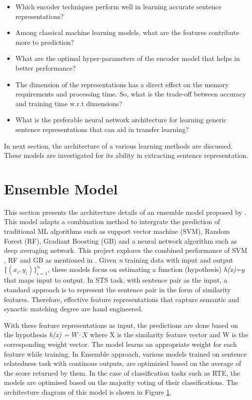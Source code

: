 \documentclass[12pt]{report} %
\begin{document}
\begin{itemize}
	\item Which encoder techniques perform well in learning accurate sentence representations?
	\item Among classical machine learning models, what are the features contribute more to prediction?
	\item What are the optimal hyper-parameters of the encoder model that helps in better performance?
	\item The dimension of the representations has a direct effect on the memory requirements and processing time. So, what is the trade-off between accuracy and training time w.r.t dimensions?
	\item What is the preferable neural network architecture for learning generic sentence representations that can aid in transfer learning?
\end{itemize}


In next section, the architecture of a various learning methods are discussed. These models are investigated for its ability in extracting sentence representation. 

\section{Ensemble Model}
\label{ensemble}

	This section presents the architecture details of an ensemble model proposed by \cite{tian2017ecnu}. This model adapts a combination method to intergrate the prediction of traditional ML algorithms such as support vector machine (SVM), Random Forest (RF), Gradiant Boosting (GB) and a neural network algorithm such as deep averaging network. This project explores the combined performance of SVM , RF and GB as mentioned in \cite{tian2017ecnu}. Given \textit{n} training data with input and output $ \{(x_i,y_i)\}^{n}_{i=1} $, these models focus on estimating a function (hypothesis) \textit{h(x)=y} that maps input to output. In STS task, with sentence pair as the input, a standard approach is to represent the sentence pair in the form of similarity features. Therefore,  effective feature representations that capture semantic and synactic matching degree are hand engineered. 
	
	With these feature representations as input, the predictions are done based on the hypothesis \textit{h(x) = $W \cdot X$} where X is the similarity feature vector and W is the corresponding weight vector.  The model learns an appropriate weight for each feature while training. In Ensemble approach, various models trained on sentence relatedness task with continous outputs, are optimizied based on the average of the score returned by them. In the case of classification tasks such as RTE, the models are optimised based on the majority voting of their classifications. The architecture diagram of this model is shown in Figure \ref{ensemble}.
	
\end{document}
